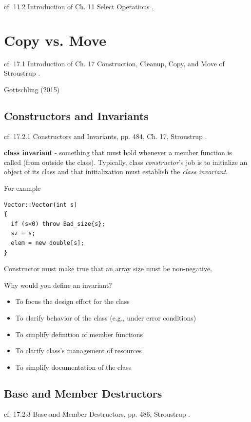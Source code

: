 \documentclass[10pt]{amsart}
\begin{document}
\begin{multicols*}{2}
cf. 11.2 Introduction of Ch. 11 Select Operations \cite{Stro2013}.  




\section{Copy vs. Move}  
cf. 17.1 Introduction of Ch. 17 Construction, Cleanup, Copy, and Move of Stroustrup \cite{Stro2013}.  

Gottschling (2015) \cite{Gott2015}

\subsection{Constructors and Invariants}

cf. 17.2.1 Constructors and Invariants, pp. 484, Ch. 17, Stroustrup \cite{Stro2013}.

\textbf{class invariant} - something that must hold whenever a member function is called (from outside the class). Typically, class \emph{constructor}'s job is to initialize an object of its class and that initialization must establish the \emph{class invariant}.

For example
\begin{lstlisting}
Vector::Vector(int s)
{
  if (s<0) throw Bad_size{s};
  sz = s;
  elem = new double[s];
}
\end{lstlisting}

Constructor must make true that an array size must be non-negative.

Why would you define an invariant?
\begin{itemize}
	\item To focus the design effort for the class
	\item To clarify behavior of the class (e.g., under error conditions)
	\item To simplify definition of member functions
	\item To clarify class's management of resources
	\item To simplify documentation of the class
\end{itemize}

\subsection{Base and Member Destructors}

cf. 17.2.3 Base and Member Destructors, pp. 486, Stroustrup \cite{Stro2013}.


\end{multicols*}
\end{document}
